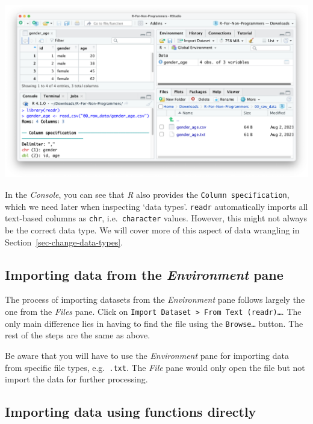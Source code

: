\documentclass[
  letterpaper,
]{krantz}
\begin{document}
\begin{enumerate}
  \includegraphics{images/chapter_07_img/01_files_pane_import/04_files_pane_import.png}
\end{enumerate}

In the \emph{Console}, you can see that \emph{R} also provides the
\texttt{Column\ specification}, which we need later when inspecting
`data types'. \texttt{readr} automatically imports all text-based
columns as \texttt{chr}, i.e.~\texttt{character} values. However, this
might not always be the correct data type. We will cover more of this
aspect of data wrangling in Section~\ref{sec-change-data-types}.

\subsection{\texorpdfstring{Importing data from the \emph{Environment}
pane}{Importing data from the Environment pane}}\label{sec-importing-data-from-the-environment-pane}

The process of importing datasets from the \emph{Environment} pane
follows largely the one from the \emph{Files} pane. Click on
\texttt{Import\ Dataset\ \textgreater{}\ From\ Text\ (readr)…}. The only
main difference lies in having to find the file using the
\texttt{Browse…} button. The rest of the steps are the same as above.

Be aware that you will have to use the \emph{Environment} pane for
importing data from specific file types, e.g.~\texttt{.txt}. The
\emph{File} pane would only open the file but not import the data for
further processing.

\subsection{Importing data using functions
directly}\label{sec-importing-data-using-functions}
\end{document}
